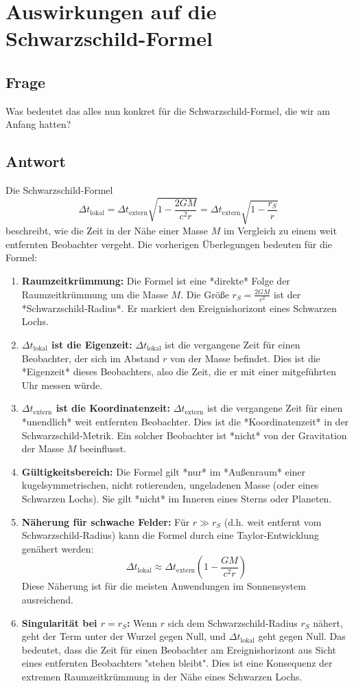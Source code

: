 \documentclass{article}
\begin{document}
	\section{Auswirkungen auf die Schwarzschild-Formel}
	
	\subsection{Frage}
	Was bedeutet das alles nun konkret für die Schwarzschild-Formel, die wir am Anfang hatten?
	
	\subsection{Antwort}
	Die Schwarzschild-Formel
	\[
	\Delta t_{\text{lokal}} = \Delta t_{\text{extern}} \sqrt{1 - \frac{2GM}{c^2 r}} = \Delta t_{\text{extern}} \sqrt{1 - \frac{r_S}{r}}
	\]
	beschreibt, wie die Zeit in der Nähe einer Masse \(M\) im Vergleich zu einem weit entfernten Beobachter vergeht. Die vorherigen Überlegungen bedeuten für die Formel:
	
	\begin{enumerate}
		\item \textbf{Raumzeitkrümmung:} Die Formel ist eine *direkte* Folge der Raumzeitkrümmung um die Masse \(M\). Die Größe \(r_S = \frac{2GM}{c^2}\) ist der *Schwarzschild-Radius*. Er markiert den Ereignishorizont eines Schwarzen Lochs.
		\item \textbf{\(\Delta t_{\text{lokal}}\) ist die Eigenzeit:} \(\Delta t_{\text{lokal}}\) ist die vergangene Zeit für einen Beobachter, der sich im Abstand \(r\) von der Masse befindet. Dies ist die *Eigenzeit* dieses Beobachters, also die Zeit, die er mit einer mitgeführten Uhr messen würde.
		\item \textbf{\(\Delta t_{\text{extern}}\) ist die Koordinatenzeit:} \(\Delta t_{\text{extern}}\) ist die vergangene Zeit für einen *unendlich* weit entfernten Beobachter. Dies ist die *Koordinatenzeit* in der Schwarzschild-Metrik. Ein solcher Beobachter ist *nicht* von der Gravitation der Masse \(M\) beeinflusst.
		\item \textbf{Gültigkeitsbereich:} Die Formel gilt *nur* im *Außenraum* einer kugelsymmetrischen, nicht rotierenden, ungeladenen Masse (oder eines Schwarzen Lochs). Sie gilt *nicht* im Inneren eines Sterns oder Planeten.
		\item \textbf{Näherung für schwache Felder:} Für \(r \gg r_S\) (d.h. weit entfernt vom Schwarzschild-Radius) kann die Formel durch eine Taylor-Entwicklung genähert werden:
		\[
		\Delta t_{\text{lokal}} \approx \Delta t_{\text{extern}} \left(1 - \frac{GM}{c^2 r}\right)
		\]
		Diese Näherung ist für die meisten Anwendungen im Sonnensystem ausreichend.
		\item \textbf{Singularität bei \(r = r_S\):} Wenn \(r\) sich dem Schwarzschild-Radius \(r_S\) nähert, geht der Term unter der Wurzel gegen Null, und \(\Delta t_{\text{lokal}}\) geht gegen Null. Das bedeutet, dass die Zeit für einen Beobachter am Ereignishorizont aus Sicht eines entfernten Beobachters "stehen bleibt". Dies ist eine Konsequenz der extremen Raumzeitkrümmung in der Nähe eines Schwarzen Lochs.
	\end{enumerate}
	
\end{document}
